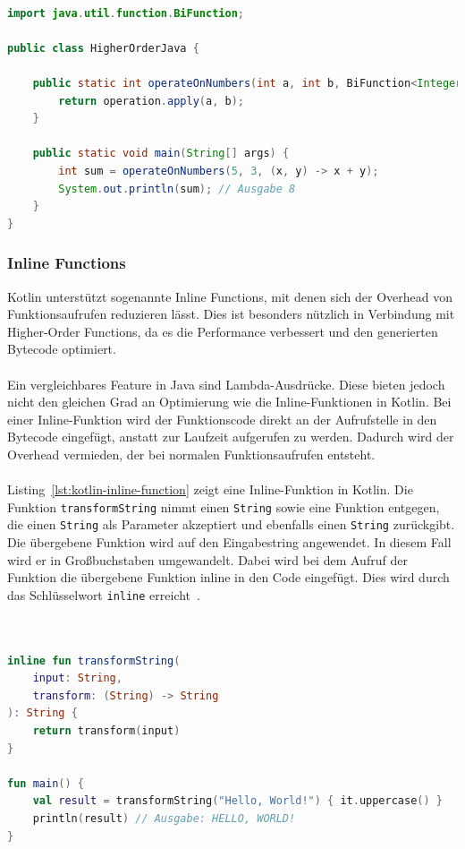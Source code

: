 \documentclass[11pt]{article}
\begin{document}
    \begin{lstlisting}[language=Java, caption={HigherOrderJava.java}, label={lst:java-higher-order-function}]

import java.util.function.BiFunction;

public class HigherOrderJava {

    public static int operateOnNumbers(int a, int b, BiFunction<Integer, Integer, Integer> operation) {
        return operation.apply(a, b);
    }

    public static void main(String[] args) {
        int sum = operateOnNumbers(5, 3, (x, y) -> x + y);
        System.out.println(sum); // Ausgabe 8
    }
}
    \end{lstlisting}

    \subsubsection{Inline Functions}
    Kotlin unterstützt sogenannte Inline Functions, mit denen sich der Overhead von Funktionsaufrufen reduzieren lässt.
    Dies ist besonders nützlich in Verbindung mit Higher-Order Functions, da es die Performance verbessert und den generierten Bytecode optimiert.\\
    \\
    Ein vergleichbares Feature in Java sind Lambda-Ausdrücke.
    Diese bieten jedoch nicht den gleichen Grad an Optimierung wie die Inline-Funktionen in Kotlin.
    Bei einer Inline-Funktion wird der Funktionscode direkt an der Aufrufstelle in den Bytecode eingefügt, anstatt zur Laufzeit aufgerufen zu werden.
    Dadurch wird der Overhead vermieden, der bei normalen Funktionsaufrufen entsteht.\\
    \\
    Listing~\ref{lst:kotlin-inline-function} zeigt eine Inline-Funktion in Kotlin.
    Die Funktion \texttt{transformString} nimmt einen \texttt{String} sowie eine Funktion entgegen, die einen \texttt{String} als Parameter akzeptiert und ebenfalls einen \texttt{String} zurückgibt.
    Die übergebene Funktion wird auf den Eingabestring angewendet.
    In diesem Fall wird er in Großbuchstaben umgewandelt.
    Dabei wird bei dem Aufruf der Funktion die übergebene Funktion inline in den Code eingefügt.
    Dies wird durch das Schlüsselwort \texttt{inline} erreicht~\cite{kotlin-inline}.\\
    \\

    \begin{lstlisting}[language=Kotlin, caption={InlineFunction.java}, label={lst:kotlin-inline-function}]

inline fun transformString(
    input: String,
    transform: (String) -> String
): String {
    return transform(input)
}

fun main() {
    val result = transformString("Hello, World!") { it.uppercase() }
    println(result) // Ausgabe: HELLO, WORLD!
}
    \end{lstlisting}
\end{document}
